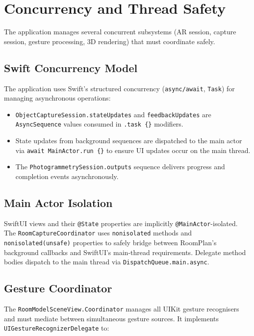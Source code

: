 \section{Concurrency and Thread Safety}
\label{sec:concurrency}

The application manages several concurrent subsystems (AR session, capture session, gesture processing, 3D rendering) that must coordinate safely.

\subsection{Swift Concurrency Model}

The application uses Swift's structured concurrency (\texttt{async/await}, \texttt{Task}) for managing asynchronous operations:

\begin{itemize}
    \item \texttt{ObjectCaptureSession.stateUpdates} and \texttt{feedbackUpdates} are \texttt{AsyncSequence} values consumed in \texttt{.task \{\}} modifiers.
    \item State updates from background sequences are dispatched to the main actor via \texttt{await MainActor.run \{\}} to ensure UI updates occur on the main thread.
    \item The \texttt{PhotogrammetrySession.outputs} sequence delivers progress and completion events asynchronously.
\end{itemize}

\subsection{Main Actor Isolation}

SwiftUI views and their \texttt{@State} properties are implicitly \texttt{@MainActor}-isolated. The \texttt{RoomCaptureCoordinator} uses \texttt{nonisolated} methods and \texttt{nonisolated(unsafe)} properties to safely bridge between RoomPlan's background callbacks and SwiftUI's main-thread requirements. Delegate method bodies dispatch to the main thread via \texttt{DispatchQueue.main.async}.

\subsection{Gesture Coordinator}

The \texttt{RoomModelSceneView.Coordinator} manages all UIKit gesture recognisers and must mediate between simultaneous gesture sources. It implements \texttt{UIGestureRecognizerDelegate} to:

